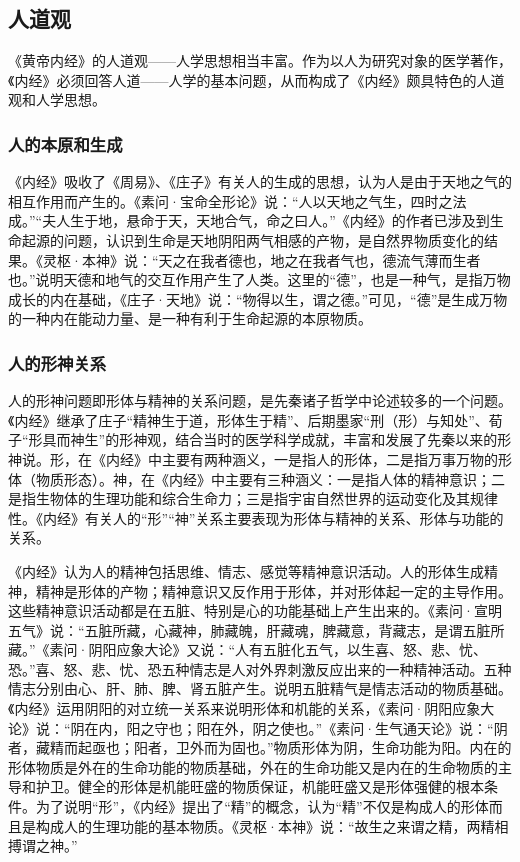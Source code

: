\documentclass[draft,12pt]{ctexbook}
\begin{document}
\subsection{人道观}%

《黄帝内经》的人道观——人学思想相当丰富。作为以人为研究对象的医学著作，《内经》必须回答人道——人学的基本问题，从而构成了《内经》颇具特色的人道观和人学思想。

\subsubsection{人的本原和生成}%

《内经》吸收了《周易》、《庄子》有关人的生成的思想，认为人是由于天地之气的相互作用而产生的。《素问·宝命全形论》说：“人以天地之气生，四时之法成。”“夫人生于地，悬命于天，天地合气，命之曰人。”《内经》的作者已涉及到生命起源的问题，认识到生命是天地阴阳两气相感的产物，是自然界物质变化的结果。《灵枢·本神》说：“天之在我者德也，地之在我者气也，德流气薄而生者也。”说明天德和地气的交互作用产生了人类。这里的“德”，也是一种气，是指万物成长的内在基础，《庄子·天地》说：“物得以生，谓之德。”可见，“德”是生成万物的一种内在能动力量、是一种有利于生命起源的本原物质。

\subsubsection{人的形神关系}%

人的形神问题即形体与精神的关系问题，是先秦诸子哲学中论述较多的一个问题。《内经》继承了庄子“精神生于道，形体生于精”、后期墨家“刑（形）与知处”、荀子“形具而神生”的形神观，结合当时的医学科学成就，丰富和发展了先秦以来的形神说。形，在《内经》中主要有两种涵义，一是指人的形体，二是指万事万物的形体（物质形态）。神，在《内经》中主要有三种涵义：一是指人体的精神意识；二是指生物体的生理功能和综合生命力；三是指宇宙自然世界的运动变化及其规律性。《内经》有关人的“形”“神”关系主要表现为形体与精神的关系、形体与功能的关系。

《内经》认为人的精神包括思维、情志、感觉等精神意识活动。人的形体生成精神，精神是形体的产物；精神意识又反作用于形体，并对形体起一定的主导作用。这些精神意识活动都是在五脏、特别是心的功能基础上产生出来的。《素问·宣明五气》说：“五脏所藏，心藏神，肺藏魄，肝藏魂，脾藏意，背藏志，是谓五脏所藏。”《素问·阴阳应象大论》又说：“人有五脏化五气，以生喜、怒、悲、忧、恐。”喜、怒、悲、忧、恐五种情志是人对外界刺激反应出来的一种精神活动。五种情志分别由心、肝、肺、脾、肾五脏产生。说明五脏精气是情志活动的物质基础。《内经》运用阴阳的对立统一关系来说明形体和机能的关系，《素问·阴阳应象大论》说：“阴在内，阳之守也；阳在外，阴之使也。”《素问·生气通天论》说：“阴者，藏精而起亟也；阳者，卫外而为固也。”物质形体为阴，生命功能为阳。内在的形体物质是外在的生命功能的物质基础，外在的生命功能又是内在的生命物质的主导和护卫。健全的形体是机能旺盛的物质保证，机能旺盛又是形体强健的根本条件。为了说明“形”，《内经》提出了“精”的概念，认为“精”不仅是构成人的形体而且是构成人的生理功能的基本物质。《灵枢·本神》说：“故生之来谓之精，两精相搏谓之神。”
\end{document}

